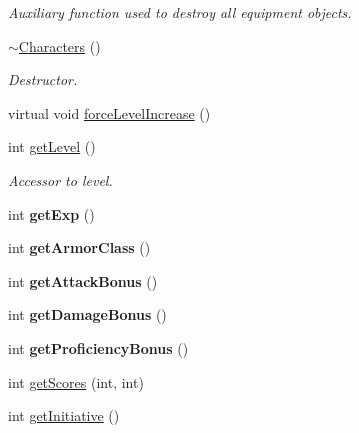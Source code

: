 \begin{DoxyCompactItemize}
\begin{DoxyCompactList}\small\item\em Auxiliary function used to destroy all equipment objects. \end{DoxyCompactList}\item 
\hypertarget{class_characters_a4aea85daea3f08b8b933e82cd42b3109}{}\label{class_characters_a4aea85daea3f08b8b933e82cd42b3109} 
\hyperlink{class_characters_a4aea85daea3f08b8b933e82cd42b3109}{$\sim$\+Characters} ()
\begin{DoxyCompactList}\small\item\em Destructor. \end{DoxyCompactList}\item 
virtual void \hyperlink{class_characters_ac5909582bf15fe17b7a6fa5104c26dd6}{force\+Level\+Increase} ()
\item 
\hypertarget{class_characters_a4d7ffd0091e9e37d6da1ad0f0ceaa48f}{}\label{class_characters_a4d7ffd0091e9e37d6da1ad0f0ceaa48f} 
int \hyperlink{class_characters_a4d7ffd0091e9e37d6da1ad0f0ceaa48f}{get\+Level} ()
\begin{DoxyCompactList}\small\item\em Accessor to level. \end{DoxyCompactList}\item 
\hypertarget{class_characters_a99a23168abd1c344526a719785d7d25c}{}\label{class_characters_a99a23168abd1c344526a719785d7d25c} 
int {\bfseries get\+Exp} ()
\item 
\hypertarget{class_characters_a5651101b826dc12d181dc91fc2830ce9}{}\label{class_characters_a5651101b826dc12d181dc91fc2830ce9} 
int {\bfseries get\+Armor\+Class} ()
\item 
\hypertarget{class_characters_a778d70b709d5a119c2cb7f051fe5f7dc}{}\label{class_characters_a778d70b709d5a119c2cb7f051fe5f7dc} 
int {\bfseries get\+Attack\+Bonus} ()
\item 
\hypertarget{class_characters_a8c6138b3dcb05fc26952f78dad8d6296}{}\label{class_characters_a8c6138b3dcb05fc26952f78dad8d6296} 
int {\bfseries get\+Damage\+Bonus} ()
\item 
\hypertarget{class_characters_acfb9c7c938b2cc023eb353f6ed7e3690}{}\label{class_characters_acfb9c7c938b2cc023eb353f6ed7e3690} 
int {\bfseries get\+Proficiency\+Bonus} ()
\item 
int \hyperlink{class_characters_a498fb8e0caaa6503fbb1e1694a082c4c}{get\+Scores} (int, int)
\item 
int \hyperlink{class_characters_af37c83d77c4c29f8f6ac230474e0177a}{get\+Initiative} ()

\end{DoxyCompactItemize}
